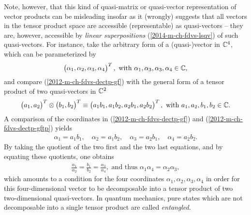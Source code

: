 Note, however, that this kind of quasi-matrix or quasi-vector representation of vector products
can be misleading insofar as
it (wrongly) suggests that all vectors in the tensor product space are accessible (representable) as quasi-vectors
-- they are, however, accessible by {\em linear superpositions} (\ref{2014-m-ch-fdvs-lsqv})
of such quasi-vectors. \label{2012-m-c-fdvs-entanglement}
For instance, take the arbitrary form of a (quasi-)vector in ${\Bbb C}^4$, which can be parameterized by
\begin{equation}
\begin{pmatrix}\alpha_1,\alpha_2,\alpha_3,\alpha_4\end{pmatrix}^T, \textrm{ with } \alpha_1,\alpha_3,\alpha_3,\alpha_4 \in {\Bbb C},
\label{2012-m-ch-fdvs-dectp-gf}
\end{equation}
and compare (\ref{2012-m-ch-fdvs-dectp-gf}) with the general form of a tensor product of two quasi-vectors in  ${\Bbb C}^2$
\begin{equation}
\begin{pmatrix}a_1,a_2\end{pmatrix}^T\otimes \begin{pmatrix}b_1,b_2\end{pmatrix}^T
\equiv \begin{pmatrix}a_1b_1, a_1 b_2,a_2b_1,a_2b_2\end{pmatrix}^T, \textrm{ with } a_1,a_2,b_1,b_2\in {\Bbb C}.
\label{2012-m-ch-fdvs-dectp-gftp}
\end{equation}
A comparison of the coordinates in
(\ref{2012-m-ch-fdvs-dectp-gf})
and
(\ref{2012-m-ch-fdvs-dectp-gftp})
yields
\begin{equation}
\begin{split}
\alpha_1=a_1b_1,\quad
\alpha_2=a_1b_2,\quad
\alpha_3=a_2b_1,\quad
\alpha_4=a_2b_2.
\end{split}
\label{2012-m-ch-fdvs-dectp-gftp-a}
\end{equation}
By taking the quotient of the two first and the two last equations, and by equating these quotients, one obtains
\begin{equation}
\begin{split}
\frac{\alpha_1}{\alpha_2}=\frac{b_1}{b_2}
=\frac{\alpha_3}{\alpha_4},\textrm{ and thus }
{\alpha_1}{\alpha_4}={\alpha_2}{\alpha_3},
\end{split}
\label{2012-m-ch-fdvs-dectp-gftp-fr}
\end{equation}
which amounts to a condition for the four coordinates  $\alpha_1,\alpha_2,\alpha_3,\alpha_4$
in order for this four-dimensional vector to be decomposable into a tensor product of two two-dimensional quasi-vectors.
In quantum mechanics, pure states which are not decomposable into a single tensor product
are called {\em entangled}.


